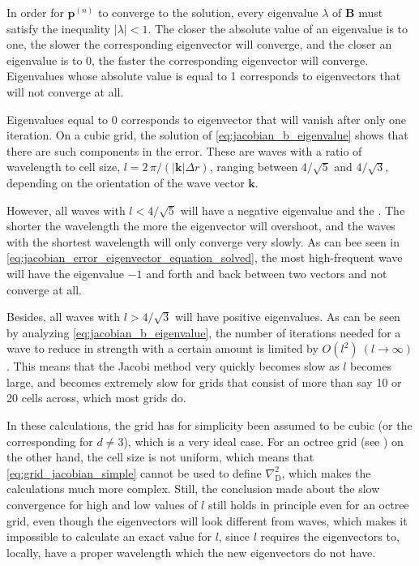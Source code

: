 In order for $\mathbf{p}^{(n)}$ to converge to the solution, every eigenvalue $\lambda$ of $\mathbf{B}$ must satisfy the inequality $|\lambda| < 1$. The closer the absolute value of an eigenvalue is to one, the slower the corresponding eigenvector will converge, and the closer an eigenvalue is to 0, the faster the corresponding eigenvector will converge. Eigenvalues whose absolute value is equal to 1 corresponds to eigenvectors that will not converge at all.

Eigenvalues equal to 0 corresponds to eigenvector that will vanish after only one iteration. On a cubic grid, the solution of \eqref{eq:jacobian_b_eigenvalue} shows that there are such components in the error. These are waves with a ratio of wavelength to cell size, $l = 2\,\pi/(|\mathbf{k}|\Delta r)$, ranging between $4/\sqrt{5}$ and $4/\sqrt{3}$, depending on the orientation of the wave vector $\mathbf{k}$.

However, all waves with $l < 4/\sqrt{5}$ will have a negative eigenvalue and \overshoot the . The shorter the wavelength the more the eigenvector will overshoot, and the waves with the shortest wavelength will only converge very slowly. As can bee seen in \eqref{eq:jacobian_error_eigenvector_equation_solved}, the most high-frequent wave will have the eigenvalue $-1$ and \oscillate forth and back between two vectors and not converge at all.

Besides, all waves with $l > 4/\sqrt{3}$ will have positive eigenvalues. As can be seen by analyzing \eqref{eq:jacobian_b_eigenvalue}, the number of iterations needed for a wave to reduce in strength with a certain amount is limited by $O(l^2)\ (l\to\infty)$. This means that the Jacobi method very quickly becomes slow as $l$ becomes large, and becomes extremely slow for grids that consist of more than say 10 or 20 cells across, which most grids do.

In these calculations, the grid has for simplicity been assumed to be cubic (or the corresponding for $d \neq 3$), which is a very ideal case. For an octree grid (see ) on the other hand, the cell size is not uniform, which means that \eqref{eq:grid_jacobian_simple} cannot be used to define $\nabla^2_{\text{D}}$, which makes the calculations much more complex. Still, the conclusion made about the slow convergence for high and low values of $l$ still holds in principle even for an octree grid, even though the eigenvectors will look different from waves, which makes it impossible to calculate an exact value for $l$, since $l$ requires the eigenvectors to, locally, have a proper wavelength which the new eigenvectors do not have.


